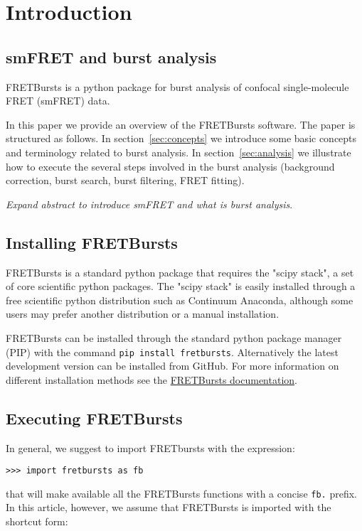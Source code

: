 \section{Introduction}

\subsection{smFRET and burst analysis}

FRETBursts is a python package for burst analysis of confocal single-molecule
FRET (smFRET) data.

In this paper we provide an overview of the FRETBursts software. The 
paper is structured as follows. In section~\ref{sec:concepts} we
introduce some basic concepts and terminology related to burst analysis.
In section~\ref{sec:analysis} we illustrate how to execute the several steps involved
in the burst analysis (background correction, burst search, burst 
filtering, FRET fitting).


\textit{Expand abstract to introduce smFRET and what is burst analysis}.

\subsection{Installing FRETBursts}
FRETBursts is a standard python package that requires the "scipy stack", a set
of core scientific python packages.
The "scipy stack" is easily installed through a free scientific python
distribution such as Continuum Anaconda, although some users may prefer another
distribution or a manual installation.

FRETBursts can be installed through the standard python package manager (PIP)
with 
the command \texttt{pip install fretbursts}. Alternatively the latest
development version can be installed from GitHub.
For more information on different installation methods see the
\href{http://fretbursts.readthedocs.org/en/latest/installation.html}{FRETBursts
documentation}.

\subsection{Executing FRETBursts}
In general, we suggest to import FRETbursts with the expression:

\begin{verbatim}
>>> import fretbursts as fb
\end{verbatim}

that will make available all the FRETBursts functions with a concise \verb|fb.|
prefix. In this article, however, we assume that FRETBursts is imported with the
shortcut form:

